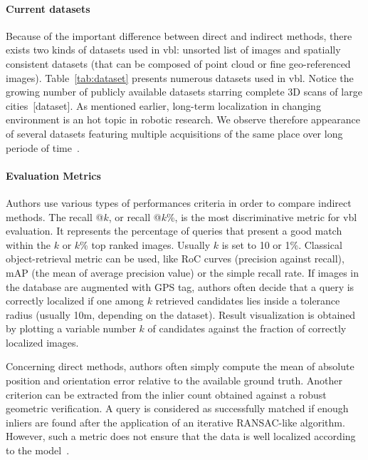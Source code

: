 		\paragraph{Current datasets} Because of the important difference between direct and indirect methods, there exists two kinds of datasets used in \ac{vbl}: unsorted list of images and spatially consistent datasets (that can be composed of point cloud or fine geo-referenced images). Table~\ref{tab:dataset} presents numerous datasets used in \ac{vbl}. Notice the growing number of publicly available datasets starring complete 3D scans of large cities~[dataset]\citep{Menze2015,Maddern2016,Wang2016}. As mentioned earlier, long-term localization in changing environment is an hot topic in robotic research. We observe therefore appearance of several datasets featuring multiple acquisitions of the same place over long periode of time~\citep{Maddern2016,Carlevaris-Bianco2016,Krajnik2010,Krajnik2014}.

		

		\paragraph{Evaluation Metrics}
		\label{subsec:evaluation_metric}
			Authors use various types of performances criteria in order to compare indirect methods. The recall @$k$, or recall @$k$\%, is the most discriminative metric for \ac{vbl} evaluation. It represents the percentage of queries that present a good match within the $k$ or $k$\% top ranked images. Usually $k$ is set to 10 or 1\%. Classical object-retrieval metric can be used, like RoC curves (precision against recall), mAP (the mean of average precision value) or the simple recall rate. If images in the database are augmented with GPS tag, authors often decide that a query is correctly localized if one among $k$ retrieved candidates lies inside a tolerance radius (usually 10m, depending on the dataset). Result visualization is obtained by plotting a variable number $k$ of candidates against the fraction of correctly localized images.
			
			Concerning direct methods, authors often simply compute the mean of absolute position and orientation error relative to the available ground truth. Another criterion can be extracted from the inlier count obtained against a robust geometric verification. A query is considered as successfully matched if enough inliers are found after the application of an iterative RANSAC-like algorithm. However, such a metric does not ensure that the data is well localized according to the model~\citep{Sattler2015}.
			
